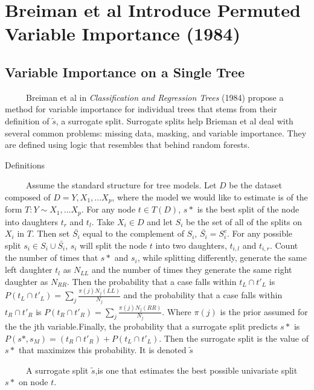\documentclass[12pt,twoside]{reedthesis}
\begin{document}
  \section{Breiman et al Introduce Permuted Variable Importance
  (1984)}\label{breiman-et-al-introduce-permuted-variable-importance-1984}
  
  \subsection{Variable Importance on a Single
  Tree}\label{variable-importance-on-a-single-tree}
  
  ~~~~~Breiman et al in \emph{Classification and Regression Trees} (1984)
  propose a method for variable importance for individual trees that stems
  from their definition of \(\tilde{s}\), a surrogate split. Surrogate
  splits help Brieman et al deal with several common problems: missing
  data, masking, and variable importance. They are defined using logic
  that resembles that behind random forests.
  
  Definitions
  
  ~~~~~Assume the standard structure for tree models. Let \(D\) be the
  dataset composed of \(D = {Y, X_1,...X_p}\), where the model we would
  like to estimate is of the form \(T: Y \sim X_1,...X_p\). For any node
  \(t \in T(D)\), \(s*\) is the best split of the node into daughters
  \(t_r\) and \(t_l\). Take \(X_i \in D\) and let \(S_i\) be the set of
  all of the splits on \(X_i\) in \(T\). Then set \(\bar{S_i}\) equal to
  the complement of \(S_i\), \(\bar{S_i} = S_i^c\). For any possible split
  \(s_i \in S_i \cup \bar{S_i}\), \(s_i\) will split the node \(t\) into
  two daughters, \(t_{i,l}\) and \(t_{i,r}\). Count the number of times
  that \(s*\) and \(s_i\), while splitting differently, generate the same
  left daughter \(t_{l}\) as \(N_{LL}\) and the number of times they
  generate the same right daughter as \(N_{RR}\). Then the probability
  that a case falls within \(t_L \cap t'_L\) is
  \(P(t_L \cap t'_L) = \sum_j \frac{\pi(j) N_j(LL)}{N_j}\) and the
  probability that a case falls within \(t_R \cap t'_R\) is
  \(P(t_R \cap t'_R) = \sum_j \frac{\pi(j) N_j(RR)}{N_j}\). Where
  \(\pi(j)\) is the prior assumed for the the jth variable.Finally, the
  probability that a surrogate split predicts \(s*\) is
  \(P(s*, s_M) = (t_R \cap t'_R) + P(t_L \cap t'_L)\). Then the surrogate
  split is the value of \(s*\) that maximizes this probability. It is
  denoted \(\tilde{s}\)
  
  ~~~~~A surrogate split \(\tilde{s}\),is one that estimates the best
  possible univariate split \(s*\) on node \(t\).
  
\end{document}
